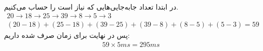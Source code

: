 \\\noindent
در ابتدا تعداد جابه‌جایی‌هایی که نیاز است را حساب می‌کنیم.
\begin{gather*}
    20 \rightarrow 18 \rightarrow 25 \rightarrow 39 \rightarrow 8 \rightarrow 5 \rightarrow 3\\
    (20 - 18) + (25 - 18) + (39 - 25) + (39 - 8) + (8 - 5) + (5 - 3) = 59
\end{gather*}
پس در نهایت برای زمان صرف شده داریم:
\begin{gather*}
    59 \times 5ms = 295ms
\end{gather*}